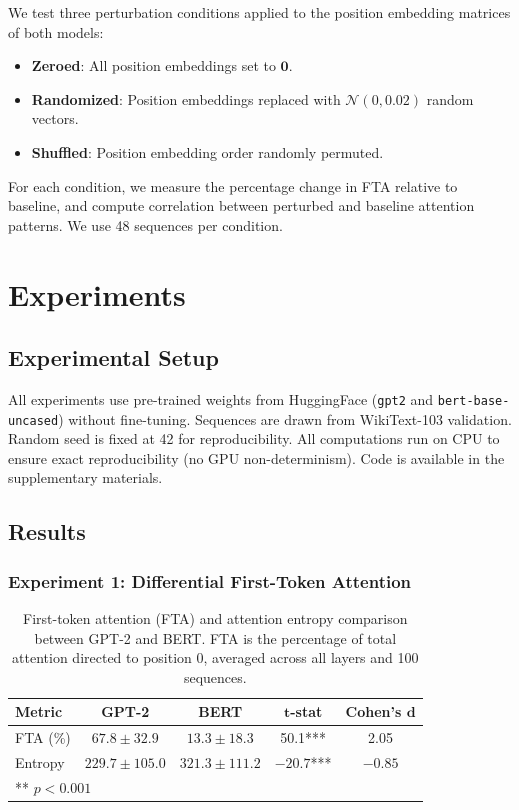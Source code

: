 \documentclass{article}
\begin{document}
We test three perturbation conditions applied to the position embedding matrices of both models:
\begin{itemize}
    \item \textbf{Zeroed}: All position embeddings set to $\mathbf{0}$.
    \item \textbf{Randomized}: Position embeddings replaced with $\mathcal{N}(0, 0.02)$ random vectors.
    \item \textbf{Shuffled}: Position embedding order randomly permuted.
\end{itemize}

For each condition, we measure the percentage change in FTA relative to baseline, and compute correlation between perturbed and baseline attention patterns. We use 48 sequences per condition.

\section{Experiments}

\subsection{Experimental Setup}

All experiments use pre-trained weights from HuggingFace (\texttt{gpt2} and \texttt{bert-base-uncased}) without fine-tuning. Sequences are drawn from WikiText-103 validation. Random seed is fixed at 42 for reproducibility. All computations run on CPU to ensure exact reproducibility (no GPU non-determinism). Code is available in the supplementary materials.

\subsection{Results}

\subsubsection{Experiment 1: Differential First-Token Attention}

\begin{table}[t]
\centering
\caption{First-token attention (FTA) and attention entropy comparison between GPT-2 and BERT. FTA is the percentage of total attention directed to position 0, averaged across all layers and 100 sequences.}
\label{tab:exp1}
\begin{tabular}{lcccc}
\toprule
\textbf{Metric} & \textbf{GPT-2} & \textbf{BERT} & $\boldsymbol{t}$\textbf{-stat} & \textbf{Cohen's} $\boldsymbol{d}$ \\
\midrule
FTA (\%) & $67.8 \pm 32.9$ & $13.3 \pm 18.3$ & 50.1*** & 2.05 \\
Entropy & $229.7 \pm 105.0$ & $321.3 \pm 111.2$ & $-20.7$*** & $-0.85$ \\
\bottomrule
\multicolumn{5}{l}{\small *** $p < 0.001$}
\end{tabular}
\end{table}
\end{document}
